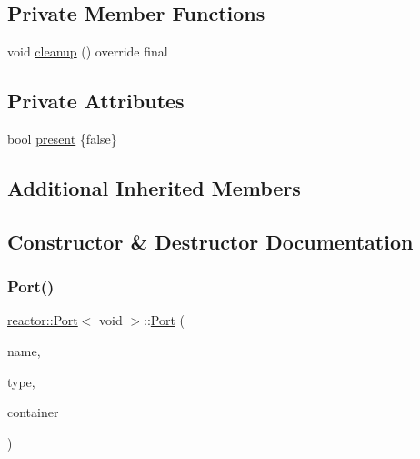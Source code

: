 \subsection*{Private Member Functions}
\begin{DoxyCompactItemize}
\item 
void \hyperlink{classreactor_1_1Port_3_01void_01_4_aedf8266554cde75e236451d8c512e4c8}{cleanup} () override final
\end{DoxyCompactItemize}
\subsection*{Private Attributes}
\begin{DoxyCompactItemize}
\item 
bool \hyperlink{classreactor_1_1Port_3_01void_01_4_aa9ab4e50d097ed98354eb6508f4e7085}{present} \{false\}
\end{DoxyCompactItemize}
\subsection*{Additional Inherited Members}


\subsection{Constructor \& Destructor Documentation}
\mbox{\label{classreactor_1_1Port_3_01void_01_4_a2114887bc779a8f035dcf0e21eabd5fd}} 
\subsubsection{\texorpdfstring{Port()}{Port()}}
{\footnotesize\ttfamily \hyperlink{classreactor_1_1Port}{reactor\+::\+Port}$<$ void $>$\+::\hyperlink{classreactor_1_1Port}{Port} (\begin{DoxyParamCaption}\item[{const std\+::string \&}]{name,  }\item[{\hyperlink{namespacereactor_a08c8e2d85e5bc706b1af8a87e40eec6d}{Port\+Type}}]{type,  }\item[{\hyperlink{classreactor_1_1Reactor}{Reactor} $\ast$}]{container }\end{DoxyParamCaption})\hspace{0.3cm}{\ttfamily [inline]}}



